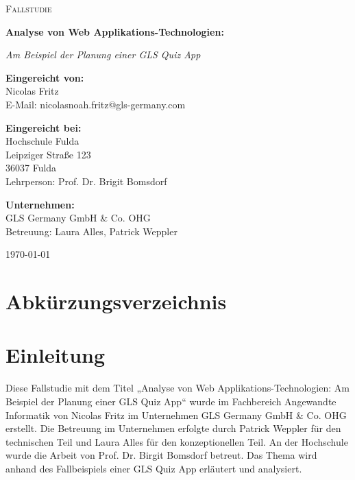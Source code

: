 \documentclass[biblatex]{lni}
\begin{document}
\begin{titlepage}
  \centering
  \vspace*{0.5cm}

  {\scshape\LARGE Fallstudie \par}

  {\huge\bfseries
    Analyse von Web Applikations-Technologien:
  \par
  }
  {\Large\itshape Am Beispiel der Planung einer GLS Quiz App\par}

  \vspace{1cm}

  {\Large\textbf{Eingereicht von: }}\\
  Nicolas Fritz \\
  E-Mail: nicolasnoah.fritz@gls-germany.com

  \vspace{1cm}

  {\Large\textbf{Eingereicht bei: }}\\
  Hochschule Fulda \\
  Leipziger Straße 123 \\
  36037 Fulda \\
  Lehrperson: Prof. Dr. Brigit Bomsdorf

  \vspace{1cm}

  {\Large\textbf{Unternehmen: }}\\
  GLS Germany GmbH & Co. OHG \\
  Betreuung: Laura Alles, Patrick Weppler

  \vfill

  {\large \today\par}
\end{titlepage}

\tableofcontents
\listoffigures
\newpage

\section*{Abkürzungsverzeichnis}
\begin{acronym}[Bash]
\end{acronym}
\newpage

\section{Einleitung}
Diese Fallstudie mit dem Titel „Analyse von Web Applikations-Technologien: Am Beispiel der Planung einer GLS Quiz App“
wurde im Fachbereich Angewandte Informatik von Nicolas Fritz im Unternehmen GLS Germany GmbH & Co. OHG erstellt.
Die Betreuung im Unternehmen erfolgte durch Patrick Weppler für den technischen Teil und Laura Alles für den konzeptionellen Teil.
An der Hochschule wurde die Arbeit von Prof. Dr. Birgit Bomsdorf betreut.
Das Thema wird anhand des Fallbeispiels einer GLS Quiz App erläutert und analysiert.
\end{document}
